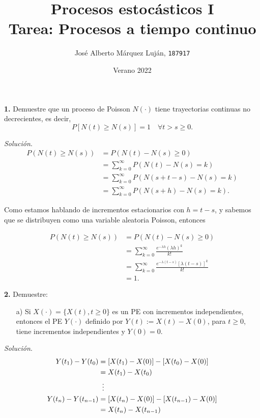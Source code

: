 \documentclass[12pt]{article}
\title{
    Procesos estocásticos I \\
    \large Tarea: Procesos a tiempo continuo
}
\author{José Alberto Márquez Luján, \texttt{187917}}
\date{Verano 2022}
\begin{document}
\maketitle

\begin{tcolorbox}[colback=blue!5!white, colframe=blue!5!white, arc=0mm, boxrule=0pt]
\textbf{1.} Demuestre que un proceso de Poisson $N(\cdot)$ tiene trayectorias continuas no decrecientes, es decir, 
\[ P[N(t) \geq N(s)] = 1 \quad \forall t > s \geq 0. \]
\end{tcolorbox}

\textit{Solución}. 
\begin{align*}
    P(N(t) \geq N(s)) &= P(N(t) - N(s) \geq 0) \\
    &= \sum_{k=0}^{\infty} P(N(t) - N(s) = k) \\
    &= \sum_{k=0}^{\infty} P(N(s+t-s) - N(s) = k) \\
    &= \sum_{k=0}^{\infty} P(N(s+h) - N(s) = k).
\end{align*}

Como estamos hablando de incrementos estacionarios con $h=t-s$, y sabemos que se distribuyen como una variable aleatoria Poisson, entonces
    
\begin{align*}
    P(N(t) \geq N(s)) &= P(N(t) - N(s) \geq 0) \\
    &= \sum_{k=0}^{\infty} \frac{e^{-\lambda h}(\lambda h)^k}{k!} \\
    &= \sum_{k=0}^{\infty} \frac{e^{-\lambda (t-s)}[\lambda (t-s)]^k}{k!} \\
    &= 1.
\end{align*}

\begin{tcolorbox}[colback=blue!5!white, colframe=blue!5!white, arc=0mm, boxrule=0pt]
\textbf{2.} Demuestre:
\begin{itemize}
    \item[a)] Si $X(\cdot) = \{ X(t), t \geq 0 \}$ es un PE con incrementos independientes, entonces el PE $Y(\cdot)$ definido por $Y(t) := X(t)-X(0)$, para $t\geq0$, tiene incrementos independientes y $Y(0) = 0$.
\end{itemize}
\end{tcolorbox}

\textit{Solución}.
\begin{align*}
    Y(t_1) - Y(t_0) &= [X(t_1) - X(0)] - [X(t_0) - X(0)] \\
    &= X(t_1) - X(t_0) \\
    &\vdotswithin{=} \notag \\
    Y(t_n) - Y(t_{n-1}) &= [X(t_n) - X(0)] - [X(t_{n-1}) - X(0)] \\
    &= X(t_n) - X(t_{n-1})
\end{align*}
\end{document}

